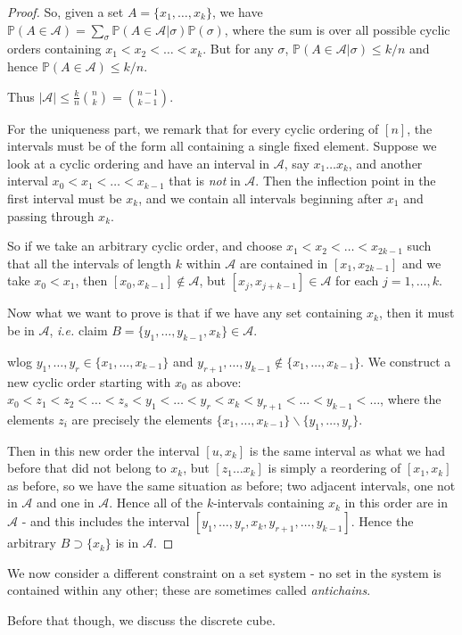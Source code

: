 \documentclass[]{article}
\theoremstyle{custhm}
\theoremstyle{cusdef}
\theoremstyle{custhm}
\theoremstyle{custhm}
\theoremstyle{custhm}
\theoremstyle{custhm}
\theoremstyle{cusdef}
\theoremstyle{remark}
\newcommand{\ie}{\textit{i.e. }}
\renewcommand{\P}{\mathbb{P}}
\renewcommand{\it}[1]{\textit{#1}}
\newcommand{\A}{\mathcal{A}}
\begin{document}
\begin{proof}
So, given a set $A = \{x_1,\dots,x_k\}$, we have $\P(A\in \A) = \sum_{\sigma}\P(A\in \A|\sigma)\P(\sigma)$, where the sum is over all possible cyclic orders containing $x_1<x_2<\dots < x_k$. But for any $\sigma$, $\P(A\in \A|\sigma) \le k/n$ and hence $\P(A\in\A)\le k/n$.

Thus $|\A| \le \frac{k}{n}{n\choose k} = {n-1\choose k-1}$.

For the uniqueness part, we remark that for every cyclic ordering of $[n]$, the intervals must be of the form all containing a single fixed element. Suppose we look at a cyclic ordering and have an interval in $\A$, say $x_1\dots x_k$, and another interval $x_0 < x_1 < \dots < x_{k-1}$ that is \it{not} in $\A$. Then the inflection point in the first interval must be $x_k$, and we contain all intervals beginning after $x_1$ and passing through $x_k$.

So if we take an arbitrary cyclic order, and choose $x_1 < x_2 < \dots < x_{2k-1}$ such that all the intervals of length $k$ within $\A$ are contained in $[x_1,x_{2k-1}]$ and we take $x_0 < x_1$, then $[x_0,x_{k-1}]\not\in\A$, but $[x_j,x_{j+k-1}]\in\A$ for each $j = 1,\dots,k$.

Now what we want to prove is that if we have any set containing $x_k$, then it must be in $\A$, \ie claim $B = \{y_1,\dots,y_{k-1},x_k\}\in\A$.

wlog $y_1,\dots,y_r\in\{x_1,\dots,x_{k-1}\}$ and $y_{r+1},\dots,y_{k-1}\not\in\{x_1,\dots,x_{k-1}\}$. We construct a new cyclic order starting with $x_0$ as above: $x_0 < z_1 < z_2 < \dots < z_s < y_1 < \dots < y_r < x_{k} < y_{r+1}<\dots <y_{k-1}<\dots$, where the elements $z_i$ are precisely the elements $\{x_1,\dots,x_{k-1}\}\backslash \{y_1,\dots,y_r\}$.

Then in this new order the interval $[u,x_k]$ is the same interval as what we had before that did not belong to $x_k$, but $[z_1\dots x_k]$ is simply a reordering of $[x_1,x_k]$ as before, so we have the same situation as before; two adjacent intervals, one not in $\A$ and one in $\A$. Hence all of the $k$-intervals containing $x_k$ in this order are in $\A$ - and this includes the interval $[y_1,\dots,y_r,x_k,y_{r+1},\dots,y_{k-1}]$. Hence the arbitrary $B\supset \{x_k\}$ is in $\A$.
\end{proof}

We now consider a different constraint on a set system - no set in the system is contained within any other; these are sometimes called \it{antichains}.

Before that though, we discuss the discrete cube.
\end{document}
